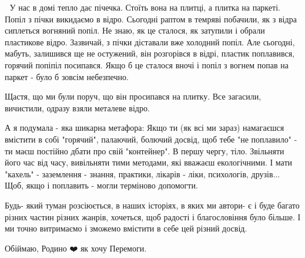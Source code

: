 🌲 У нас в домі тепло дає пічечка. Стоїть вона на плитці, а плитка на паркеті.
Попіл з пічки викидаємо в відро. Сьогодні раптом в темряві побачили, як з відра
сиплеться вогняний попіл. Не знаю, як це сталося, як затупили і обрали
пластикове відро. Зазвичай, з пічки діставали вже холодний попіл. Але сьогодні,
мабуть, залишився ще не остужений, він розгорівся в відрі, пластик поплавився,
горячий попіпіл посипався. Якщо б це сталося вночі і попіл з вогнем попав на
паркет - було б зовсім небезпечно. 

Щастя, що ми були поруч, що він просипався на плитку. Все загасили, вичистили,
одразу взяли металеве відро. 

А я подумала - яка шикарна метафора: Якщо ти (як всі ми зараз) намагаєшся
вмістити в собі "горячий", палаючий, болючий досвід, щоб тебе "не поплавило" -
ти маєш постійно дбати про свій "контейнер". В першу чергу, тіло. Звільняти
його час від часу, вивільняти тими методами, які вважаєш екологічними.  І мати
"кахель" - заземлення - знання, практики, лікарів - ліки, психологів, друзів...
Щоб, якщо і поплавить - могли терміново допомогти. 

Будь- який туман розсіюється, в наших історіях, в яких ми автори- є і буде
багато різних частин різних жанрів, хочеться, щоб радості і благословіння було
більше. І ми точно витримаємо і зможемо вмістити в себе цей різний досвід. 

Обіймаю, Родино ❤️ як хочу Перемоги.

